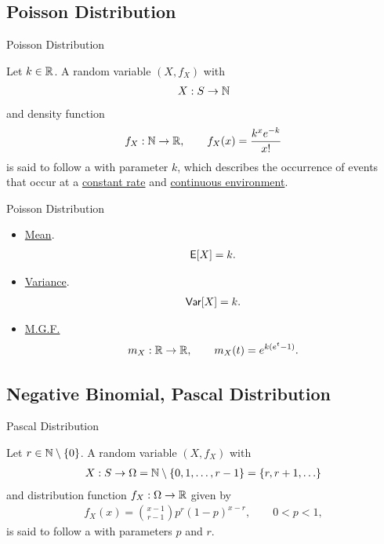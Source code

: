 \subsection{Poisson Distribution}

\begin{frame}{Poisson Distribution}

\justifying
{} Let $k\in \mathbb{R}$. A random variable $(X, f_X)$ with
\begin{align*}
X: S\rightarrow \mathbb{N}
\end{align*}
and density function 
\begin{align*}
f_X: \mathbb{N} \rightarrow \mathbb{R}, \qquad f_X(x) = \frac{k^xe^{-k}}{x!}
\end{align*}
is said to follow a  with parameter $k$, which describes the occurrence of events that occur at a \underline{constant rate} and \underline{continuous environment}.

\end{frame}

\begin{frame}{Poisson Distribution}

\justifying
{} 
\begin{itemize}
\justifying
\item \underline{Mean}.
\begin{align*}
\mathsf{E}[X] = k.
\end{align*}
\item \underline{Variance}.
\begin{align*}
\mathsf{Var}[X] = k.
\end{align*}
\item \underline{M.G.F.}
\begin{align*}
m_X: \mathbb{R} \rightarrow \mathbb{R}, \qquad m_X(t) = e^{k(e^t-1)}.
\end{align*}
\end{itemize}

\end{frame}


\subsection{Negative Binomial, Pascal Distribution}

\begin{frame}{Pascal Distribution}

\justifying
{} Let $r\in \mathbb{N}\setminus \{0\}$. A random variable $(X, f_X)$ with
\begin{align*}
X: S \rightarrow \Omega = \mathbb{N}\setminus \{0, 1, \ldots, r-1\} = \{r, r+1, \ldots\}
\end{align*}
and distribution function $f_X: \Omega\rightarrow \mathbb{R}$ given by
\begin{align*}
f_X(x) = \binom{x-1}{r-1} p^r(1-p)^{x-r}, \qquad 0 < p < 1,
\end{align*}
is said to follow a  with parameters $p$ and $r$.

\end{frame}

